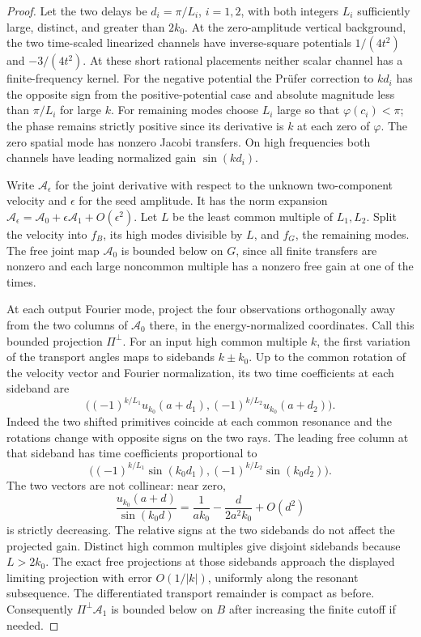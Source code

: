 \begin{proof}
Let the two delays be $d_i=\pi/L_i$, $i=1,2$,
with both integers $L_i$ sufficiently large,
distinct, and greater than $2k_0$.
At the zero-amplitude vertical background, the two
time-scaled linearized channels have inverse-square
potentials $1/(4t^2)$ and $-3/(4t^2)$.
At these short rational placements neither scalar
channel has a finite-frequency kernel.
For the negative potential the Pr\"ufer correction
to $kd_i$ has the opposite sign from the
positive-potential case and absolute magnitude
less than $\pi/L_i$ for large $k$.
For remaining modes choose $L_i$ large so that
$\varphi(c_i)<\pi$; the phase remains strictly
positive since its derivative is $k$ at each
zero of $\varphi$. The zero spatial mode has
nonzero Jacobi transfers.
On high frequencies both channels have leading
normalized gain $\sin(kd_i)$.

Write $\mathcal A_\epsilon$ for the joint derivative
with respect to the unknown two-component velocity
and $\epsilon$ for the seed amplitude.
It has the norm expansion
$\mathcal A_\epsilon=\mathcal A_0+
\epsilon \mathcal A_1+O(\epsilon^2)$.
Let $L$ be the least common multiple of $L_1,L_2$.
Split the velocity into $f_B$, its high modes
divisible by $L$, and $f_G$, the remaining modes.
The free joint map $\mathcal A_0$ is bounded below on
$G$, since all finite transfers are nonzero and
each large noncommon multiple has a nonzero free
gain at one of the times.

At each output Fourier mode, project the four
observations orthogonally away from the two
columns of $\mathcal A_0$ there, in the
energy-normalized coordinates. Call this bounded
projection $\Pi^\perp$.
For an input high common multiple $k$, the first
variation of the transport angles maps to sidebands
$k\pm k_0$. Up to the common rotation of the
velocity vector and Fourier normalization, its
two time coefficients at each sideband are
\[
 \big((-1)^{k/L_1}u_{k_0}(a+d_1),
      (-1)^{k/L_2}u_{k_0}(a+d_2)\big).
\]
Indeed the two shifted primitives coincide at each
common resonance and the rotations change with
opposite signs on the two rays.
The leading free column at that sideband has time
coefficients proportional to
\[
 \big((-1)^{k/L_1}\sin(k_0d_1),
      (-1)^{k/L_2}\sin(k_0d_2)\big).
\]
The two vectors are not collinear: near zero,
\[
 \frac{u_{k_0}(a+d)}{\sin(k_0d)}
    =\frac1{a k_0}-\frac{d}{2a^2 k_0}+O(d^2)
\]
is strictly decreasing. The relative signs at
the two sidebands do not affect the projected gain.
Distinct high common multiples give disjoint
sidebands because $L>2k_0$.
The exact free projections at those sidebands
approach the displayed limiting projection with
error $O(1/|k|)$, uniformly along the resonant
subsequence. The differentiated transport remainder
is compact as before. Consequently
$\Pi^\perp\mathcal A_1$ is bounded below on $B$
after increasing the finite cutoff if needed.


\end{proof}
